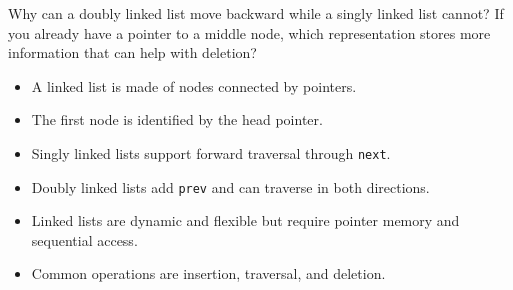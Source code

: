 \begin{quickcheck}
Why can a doubly linked list move backward while a singly linked list cannot? If you already have a pointer to a middle node, which representation stores more information that can help with deletion?
\end{quickcheck}

\begin{chapterrecap}
\begin{itemize}
  \item A linked list is made of nodes connected by pointers.
  \item The first node is identified by the head pointer.
  \item Singly linked lists support forward traversal through \texttt{next}.
  \item Doubly linked lists add \texttt{prev} and can traverse in both directions.
  \item Linked lists are dynamic and flexible but require pointer memory and sequential access.
  \item Common operations are insertion, traversal, and deletion.
\end{itemize}
\end{chapterrecap}


